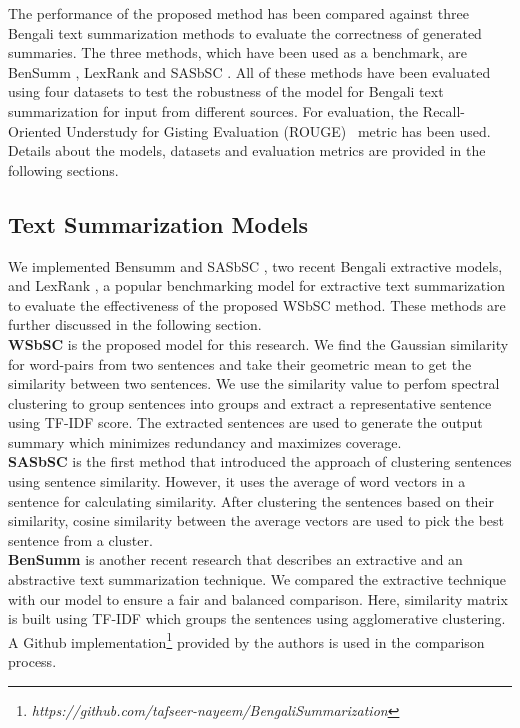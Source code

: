 The performance of the proposed method has been compared against three Bengali text summarization methods to evaluate the correctness of generated summaries. The three methods, which have been used as a benchmark, are BenSumm \cite{chowdhury-etal-2021-tfidf-clustering}, LexRank \cite{Erkan-lexRank-2004} and SASbSC \cite{roychowdhury-etal-2022-spectral-base}. All of these methods have been evaluated using four datasets to test the robustness of the model for Bengali text summarization for input from different sources. For evaluation, the Recall-Oriented Understudy for Gisting Evaluation (ROUGE)~\cite{lin-2004-rouge} metric has been used. Details about the models, datasets and evaluation metrics are provided in the following sections.

\subsection{Text Summarization Models}\label{subsec:text-summarization-models}
We implemented Bensumm \cite{chowdhury-etal-2021-tfidf-clustering} and SASbSC \cite{roychowdhury-etal-2022-spectral-base}, two recent Bengali extractive models, and LexRank \cite{Erkan-lexRank-2004}, a popular benchmarking model for extractive text summarization to evaluate the effectiveness of the proposed WSbSC method. These methods are further discussed in the following section.\\

\textbf{WSbSC} is the proposed model for this research. We find the Gaussian similarity for word-pairs from two sentences and take their geometric mean to get the similarity between two sentences. We use the similarity value to perfom spectral clustering to group sentences into groups and extract a representative sentence using TF-IDF score. The extracted sentences are used to generate the output summary which minimizes redundancy and maximizes coverage.\\

\textbf{SASbSC} \cite{roychowdhury-etal-2022-spectral-base} is the first method that introduced the approach of clustering sentences using sentence similarity. However, it uses the average of word vectors in a sentence for calculating similarity. After clustering the sentences based on their similarity, cosine similarity between the average vectors are used to pick the best sentence from a cluster.\\

\textbf{BenSumm} \cite{chowdhury-etal-2021-tfidf-clustering} is another recent research that describes an extractive and an abstractive text summarization technique. We compared the extractive technique with our model to ensure a fair and balanced comparison. Here, similarity matrix is built using TF-IDF which groups the sentences using agglomerative clustering. A Github implementation\footnote{\textit{https://github.com/tafseer-nayeem/BengaliSummarization}} provided by the authors is used in the comparison process.\\

